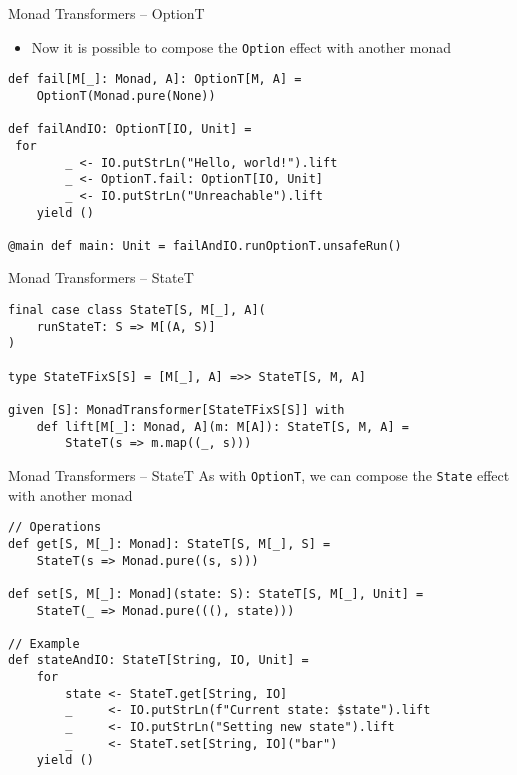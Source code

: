 \documentclass[presentation, 10pt]{beamer}\mode<presentation>{\usetheme{metropolis}}
\begin{document}
\begin{frame}[fragile]{Monad Transformers -- OptionT}
\begin{itemize}
	\item Now it is possible to compose the \texttt{Option} effect with another monad
\end{itemize}
\begin{tcolorbox}
\begin{verbatim}
def fail[M[_]: Monad, A]: OptionT[M, A] = 
	OptionT(Monad.pure(None)) 

def failAndIO: OptionT[IO, Unit] = 
 for 
 		_ <- IO.putStrLn("Hello, world!").lift 
		_ <- OptionT.fail: OptionT[IO, Unit] 
		_ <- IO.putStrLn("Unreachable").lift 
	yield ()	

@main def main: Unit = failAndIO.runOptionT.unsafeRun()
\end{verbatim}
\end{tcolorbox}
\end{frame}
\begin{frame}[fragile]{Monad Transformers -- StateT}
\begin{center}	
\begin{tcolorbox}
\begin{verbatim}
final case class StateT[S, M[_], A](
	runStateT: S => M[(A, S)]
)

type StateTFixS[S] = [M[_], A] =>> StateT[S, M, A]

given [S]: MonadTransformer[StateTFixS[S]] with
	def lift[M[_]: Monad, A](m: M[A]): StateT[S, M, A] =
		StateT(s => m.map((_, s)))
\end{verbatim}
\end{tcolorbox}
\end{center}
\end{frame}
\begin{frame}[fragile]{Monad Transformers -- StateT}
As with \texttt{OptionT}, we can compose the \texttt{State} effect with another monad
\begin{tcolorbox}
\begin{verbatim}
// Operations
def get[S, M[_]: Monad]: StateT[S, M[_], S] =
	StateT(s => Monad.pure((s, s)))

def set[S, M[_]: Monad](state: S): StateT[S, M[_], Unit] =
	StateT(_ => Monad.pure(((), state)))

// Example
def stateAndIO: StateT[String, IO, Unit] =
	for
		state <- StateT.get[String, IO]
		_     <- IO.putStrLn(f"Current state: $state").lift
		_     <- IO.putStrLn("Setting new state").lift
		_     <- StateT.set[String, IO]("bar")
	yield ()
\end{verbatim}
\end{tcolorbox}
\end{frame}
\end{document}
